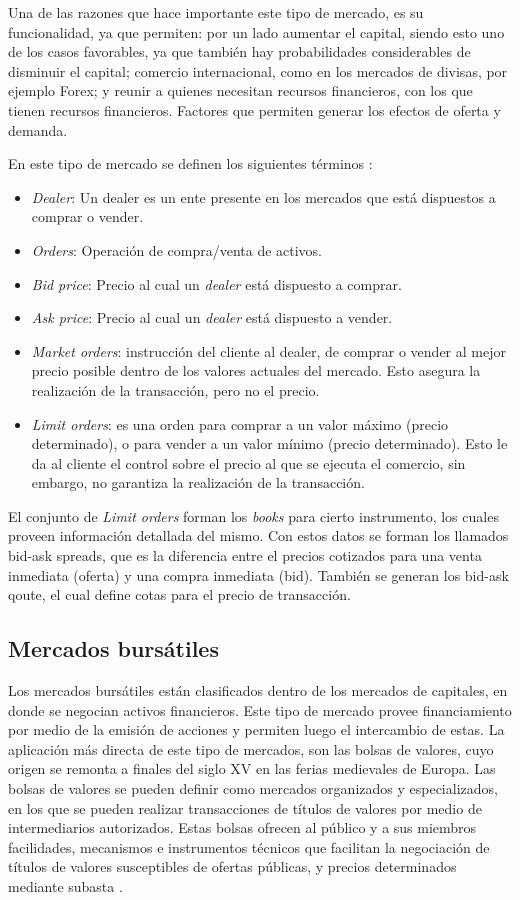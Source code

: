Una de las razones que hace importante este tipo de mercado, es su funcionalidad, ya que permiten: por un lado aumentar el capital, siendo esto uno 
de los casos favorables, ya que también hay probabilidades considerables de disminuir el capital; comercio internacional, como en los mercados de 
divisas, por ejemplo Forex; y reunir a quienes necesitan recursos financieros, con los que tienen recursos financieros. Factores que permiten generar los 
efectos de oferta y demanda.

En este tipo de mercado se definen los siguientes términos \cite{nevmyvaka2003electronic}:
\begin{itemize}
	\item \emph{Dealer}: Un dealer es un ente presente en los mercados que está dispuestos a comprar o vender.
	\item \emph{Orders}: Operación de compra/venta de activos.
	\item \emph{Bid price}: Precio al cual un \emph{dealer} está dispuesto a comprar.
	\item \emph{Ask price}: Precio al cual un \emph{dealer} está dispuesto a vender.
	\item \emph{Market orders}: instrucción del cliente al dealer, de comprar o vender al mejor precio posible dentro de los valores actuales del mercado.
		Esto asegura la realización de la transacción, pero no el precio.
	\item \emph{Limit orders}: es una orden para comprar a un valor máximo (precio determinado), o para vender a un valor mínimo (precio determinado).
		Esto le da al cliente el control sobre el precio al que se ejecuta el comercio, sin embargo, no garantiza la realización de la transacción.
\end{itemize}

El conjunto de \emph{Limit orders} forman los \emph{books} para cierto instrumento, los cuales proveen información detallada del mismo. Con estos datos
se forman los llamados bid-ask spreads, que es la diferencia entre el precios cotizados para una venta inmediata (oferta) y una compra inmediata (bid). 
También se generan los bid-ask qoute, el cual define cotas para el precio de transacción.

\subsection{Mercados bursátiles}
Los mercados bursátiles están clasificados dentro de los mercados de capitales, en donde se negocian activos financieros. Este tipo de mercado provee financiamiento
por medio de la emisión de acciones y permiten luego el intercambio de estas. La aplicación más directa de este tipo de mercados, son las bolsas de valores, cuyo
origen se remonta a finales del siglo XV en las ferias medievales de Europa. Las bolsas de valores se pueden definir como mercados organizados y especializados, en 
los que se pueden realizar transacciones de títulos de valores por medio de intermediarios autorizados. Estas bolsas ofrecen al público y a sus miembros facilidades, 
mecanismos e instrumentos técnicos que facilitan la negociación de títulos de valores susceptibles de ofertas públicas, y precios determinados mediante subasta \cite{levine1998stock}.

